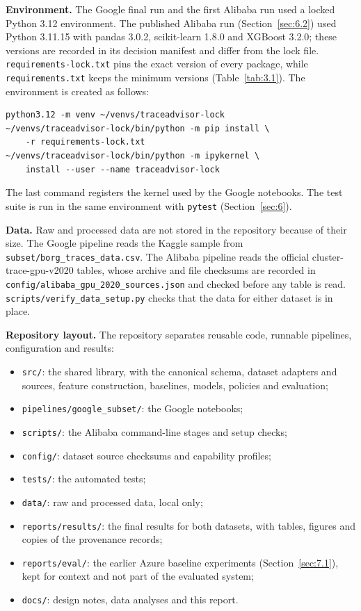 \textbf{Environment.} The Google final run and the first Alibaba run used a locked Python 3.12 environment. The published Alibaba run (Section~\ref{sec:6.2}) used Python 3.11.15 with pandas 3.0.2, scikit-learn 1.8.0 and XGBoost 3.2.0; these versions are recorded in its decision manifest and differ from the lock file. \texttt{requirements-lock.txt} pins the exact version of every package, while \texttt{requirements.txt} keeps the minimum versions (Table~\ref{tab:3.1}). The environment is created as follows:

{\footnotesize
\begin{verbatim}
python3.12 -m venv ~/venvs/traceadvisor-lock
~/venvs/traceadvisor-lock/bin/python -m pip install \
    -r requirements-lock.txt
~/venvs/traceadvisor-lock/bin/python -m ipykernel \
    install --user --name traceadvisor-lock
\end{verbatim}
}

The last command registers the kernel used by the Google notebooks. The test suite is run in the same environment with \texttt{pytest} (Section~\ref{sec:6}).

\textbf{Data.} Raw and processed data are not stored in the repository because of their size. The Google pipeline reads the Kaggle sample from \texttt{subset/borg\_traces\_data.csv}. The Alibaba pipeline reads the official cluster-trace-gpu-v2020 tables, whose archive and file checksums are recorded in \texttt{config/alibaba\_gpu\_2020\_sources.json} and checked before any table is read. \texttt{scripts/verify\_data\_setup.py} checks that the data for either dataset is in place.

\textbf{Repository layout.} The repository separates reusable code, runnable pipelines, configuration and results:

\begin{itemize}
\tightlist
\item
  \texttt{src/}: the shared library, with the canonical schema, dataset adapters and sources, feature construction, baselines, models, policies and evaluation;
\item
  \texttt{pipelines/google\_subset/}: the Google notebooks;
\item
  \texttt{scripts/}: the Alibaba command-line stages and setup checks;
\item
  \texttt{config/}: dataset source checksums and capability profiles;
\item
  \texttt{tests/}: the automated tests;
\item
  \texttt{data/}: raw and processed data, local only;
\item
  \texttt{reports/results/}: the final results for both datasets, with tables, figures and copies of the provenance records;
\item
  \texttt{reports/eval/}: the earlier Azure baseline experiments (Section~\ref{sec:7.1}), kept for context and not part of the evaluated system;
\item
  \texttt{docs/}: design notes, data analyses and this report.
\end{itemize}


